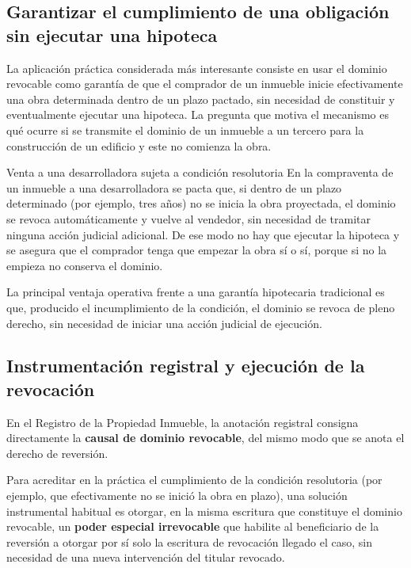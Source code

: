 \documentclass[12pt,oneside]{book}
\begin{document}
\subsection{Garantizar el cumplimiento de una obligación sin ejecutar una hipoteca}

La aplicación práctica considerada más interesante consiste en usar el dominio revocable como garantía de que el comprador de un inmueble inicie efectivamente una obra determinada dentro de un plazo pactado, sin necesidad de constituir y eventualmente ejecutar una hipoteca. La pregunta que motiva el mecanismo es qué ocurre si se transmite el dominio de un inmueble a un tercero para la construcción de un edificio y este no comienza la obra.

\begin{example}{Venta a una desarrolladora sujeta a condición resolutoria}
En la compraventa de un inmueble a una desarrolladora se pacta que, si dentro de un plazo determinado (por ejemplo, tres años) no se inicia la obra proyectada, el dominio se revoca automáticamente y vuelve al vendedor, sin necesidad de tramitar ninguna acción judicial adicional. De ese modo no hay que ejecutar la hipoteca y se asegura que el comprador tenga que empezar la obra sí o sí, porque si no la empieza no conserva el dominio.
\end{example}

La principal ventaja operativa frente a una garantía hipotecaria tradicional es que, producido el incumplimiento de la condición, el dominio se revoca de pleno derecho, sin necesidad de iniciar una acción judicial de ejecución.

\subsection{Instrumentación registral y ejecución de la revocación}

En el Registro de la Propiedad Inmueble, la anotación registral consigna directamente la \textbf{causal de dominio revocable}, del mismo modo que se anota el derecho de reversión.

Para acreditar en la práctica el cumplimiento de la condición resolutoria (por ejemplo, que efectivamente no se inició la obra en plazo), una solución instrumental habitual es otorgar, en la misma escritura que constituye el dominio revocable, un \textbf{poder especial irrevocable} que habilite al beneficiario de la reversión a otorgar por sí solo la escritura de revocación llegado el caso, sin necesidad de una nueva intervención del titular revocado.
\end{document}
